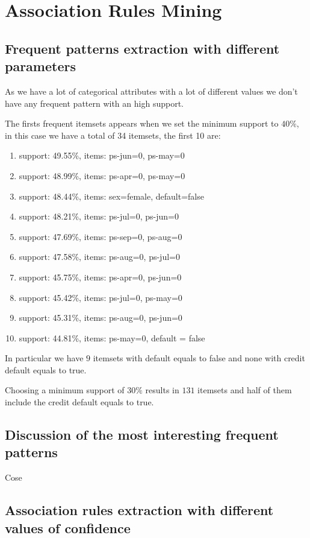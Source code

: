 \chapter{Association Rules Mining}

\section{Frequent patterns extraction with different parameters}

As we have a lot of categorical attributes with a lot of different values we don't have any frequent pattern with an high support. 

The firsts frequent itemsets appears when we set the minimum support to $40\%$, in this case we have a total of 34 itemsets, the first 10 are:

\begin{enumerate}
  \item support: 49.55\%, items: ps-jun=0, ps-may=0
  \item support: 48.99\%, items: ps-apr=0, ps-may=0
  \item support: 48.44\%, items: sex=female, default=false
  \item support: 48.21\%, items: ps-jul=0, ps-jun=0
  \item support: 47.69\%, items: ps-sep=0, ps-aug=0
  \item support: 47.58\%, items: ps-aug=0, ps-jul=0
  \item support: 45.75\%, items: ps-apr=0, ps-jun=0
  \item support: 45.42\%, items: ps-jul=0, ps-may=0
  \item support: 45.31\%, items: ps-aug=0, ps-jun=0
  \item support: 44.81\%, items: ps-may=0, default = false
\end{enumerate}

In particular we have $9$ itemsets with default equals to false and none with credit default equals to true.

Choosing a minimum support of $30\%$ results in $131$ itemsets and half of them include the credit default equals to true.


\section{Discussion of the most interesting frequent patterns}

Cose

\section{Association rules extraction with different values of confidence}


